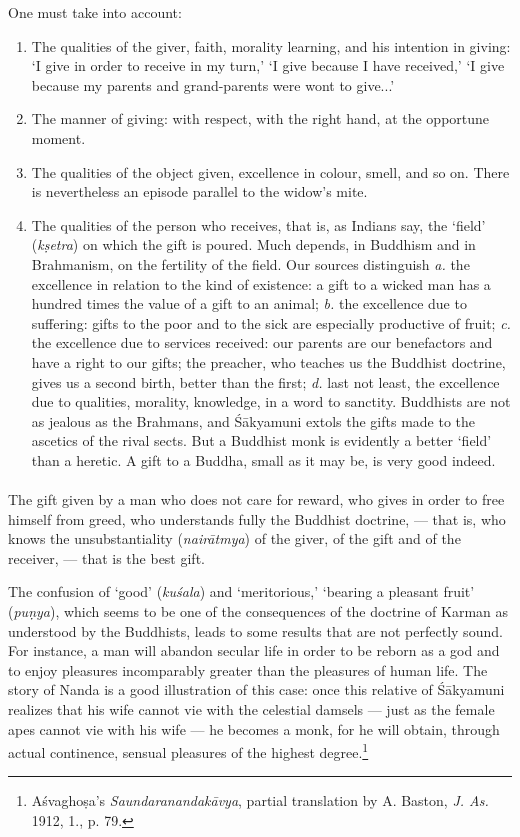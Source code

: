 \documentclass[a4paper, 11pt, oneside, english]{article}
\begin{document}
One must take into account:
\begin{enumerate}
    \item The qualities of the giver, faith, morality learning, and his intention in giving: `I give in order to receive in my turn,' `I give because I have received,' `I give because my parents and grand-parents were wont to give...'

    \item The manner of giving: with respect, with the right hand, at the opportune moment.

    \item The qualities of the object given, excellence in colour, smell, and so on. There is nevertheless an episode parallel to the widow's mite.

    \item The qualities of the person who receives, that is, as Indians say, the `field' (\emph{kṣetra}) on which the gift is poured. Much depends, in Buddhism and in Brahmanism, on the fertility of the field. Our sources distinguish \emph{a.} the excellence in relation to the kind of existence: a gift to a wicked man has a hundred times the value of a gift to an animal; \emph{b.} the excellence due to suffering: gifts to the poor and to the sick are especially productive of fruit; \emph{c.} the excellence due to services received: our parents are our benefactors and have a right to our gifts; the preacher, who teaches us the Buddhist doctrine, gives us a second birth, better than the first; \emph{d.} last not least, the excellence due to qualities, morality, knowledge, in a word to sanctity. Buddhists are not as jealous as the Brahmans, and Śākyamuni extols the gifts made to the ascetics of the rival sects. But a Buddhist monk is evidently a better `field' than a heretic. A gift to a Buddha, small as it may be, is very good indeed.
\end{enumerate}
\paragraph{}
The gift given by a man who does not care for reward, who gives in order to free himself from greed, who understands fully the Buddhist doctrine, --- that is, who knows the unsubstantiality (\emph{nairātmya}) of the giver, of the gift and of the receiver, --- that is the best gift.

The confusion of `good' (\emph{kuśala}) and `meritorious,' `bearing a pleasant fruit' (\emph{puṇya}), which seems to be one of the consequences of the doctrine of Karman as understood by the Buddhists, leads to some results that are not perfectly sound. For instance, a man will abandon secular life in order to be reborn as a god and to enjoy pleasures incomparably greater than the pleasures of human life. The story of Nanda is a good illustration of this case: once this relative of Śākyamuni realizes that his wife cannot vie with the celestial damsels --- just as the female apes cannot vie with his wife --- he becomes a monk, for he will obtain, through actual continence, sensual pleasures of the highest degree.\footnote{Aśvaghoṣa's \emph{Saundaranandakāvya}, partial translation by A. Baston, \emph{J. As.} 1912, 1., p. 79.}
\end{document}
